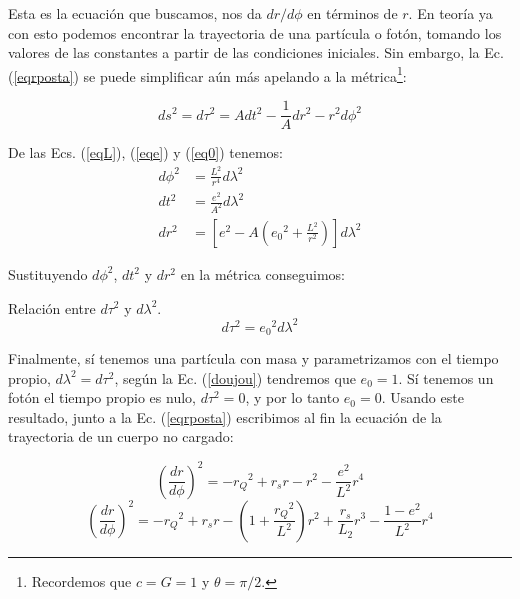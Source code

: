 Esta es la ecuación que buscamos, nos da $dr/d\phi$ en términos de $r$. En teoría ya con esto podemos encontrar la trayectoria de una partícula o fotón, tomando los valores de las constantes a partir de las condiciones iniciales. Sin embargo, la Ec. (\ref{eqrposta}) se puede simplificar aún más apelando a la métrica\footnote{Recordemos que $c=G=1$ y $\theta=\pi/2$.}:

\begin{equation}
    ds^2 = d\tau^2 = A dt^2 - \frac{1}{A} dr^2 - r^2 d\phi^2
\end{equation}

De las Ecs. (\ref{eqL}), (\ref{eqe}) y (\ref{eq0}) tenemos:
\begin{equation}
\begin{split}
    d\phi^2 &= \frac{L^2}{r^4} d\lambda^2\\
    dt^2 &= \frac{e^2}{A^2} d\lambda^2\\
    dr^2 &= \left[e^2 - A\left({e_0}^2 + \frac{L^2}{r^2}\right)\right] d\lambda^2
\end{split}
\end{equation}

Sustituyendo $d\phi^2$, $dt^2$ y $dr^2$ en la métrica conseguimos:

\begin{remarkbox}{Relación entre $d\tau^2$ y $d\lambda^2$.}
\begin{equation}
    d\tau^2 = {e_0}^2 d\lambda^2
\label{doujou}
\end{equation}
\end{remarkbox}

Finalmente, sí tenemos una partícula con masa y parametrizamos con el tiempo propio, $d\lambda^2=d\tau^2$, según la Ec. (\ref{doujou}) tendremos que $e_0=1$. Sí tenemos un fotón el tiempo propio es nulo, $d\tau^2=0$, y por lo tanto $e_0=0$. Usando este resultado, junto a la Ec. (\ref{eqrposta}) escribimos al fin la ecuación de la trayectoria de un cuerpo no cargado:

\begin{equation}
    \left( \frac{dr}{d\phi} \right)^2 = -{r_Q}^2 + r_s r - r^2 - \frac{e^2}{L^2} r^4
\label{eqlightlike}
\end{equation}
\begin{equation}
    \left( \frac{dr}{d\phi} \right)^2 = -{r_Q}^2 + r_s r - \left(1 + \frac{{r_Q}^2}{L^2} \right) r^2 + \frac{r_s}{L_2} r^3 - \frac{1 - e^2}{L^2} r^4
\label{eqtimelike}
\end{equation}

